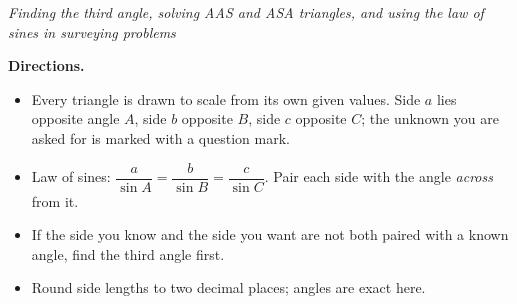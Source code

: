 \documentclass[12pt]{article}
\begin{document}


\begin{center}\small\textit{Finding the third angle, solving AAS and ASA triangles, and using the law of sines in surveying problems}\end{center}

\vspace{0.1cm}
\noindent\textbf{Directions.}
\begin{itemize}[leftmargin=0.9cm, itemsep=1pt, topsep=3pt]
  \item Every triangle is drawn to scale from its own given values. Side $a$ lies opposite angle $A$, side $b$ opposite $B$, side $c$ opposite $C$; the unknown you are asked for is marked with a question mark.
  \item Law of sines: $\dfrac{a}{\sin A} = \dfrac{b}{\sin B} = \dfrac{c}{\sin C}$. Pair each side with the angle \emph{across} from it.
  \item If the side you know and the side you want are not both paired with a known angle, find the third angle first.
  \item Round side lengths to two decimal places; angles are exact here.
\end{itemize}
\vspace{0.1cm}





\end{document}
